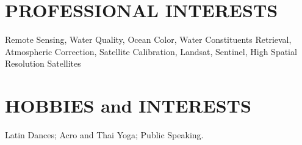 \documentclass[11pt]{res} %
\begin{document}
\begin{resume}
\vspace{-0.1in}
\section{PROFESSIONAL INTERESTS}
\vspace{0.1in}
Remote Sensing, Water Quality, Ocean Color, Water Constituents Retrieval, Atmospheric Correction, Satellite Calibration, Landsat, Sentinel, High Spatial Resolution Satellites\\

\vspace{-0.1in}
\section{HOBBIES and INTERESTS}
\vspace{0.1in}
Latin Dances; Acro and Thai Yoga; Public Speaking. \\

\end{resume}
\end{document}
